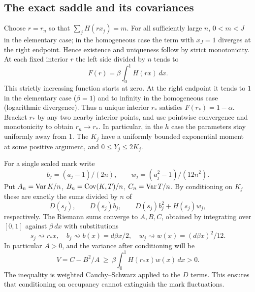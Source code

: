 \documentclass[11pt,a4paper]{article}
\begin{document}
\subsection{The exact saddle and its covariances}
Choose $r=r_n$ so that $\sum_j H(r x_j)=m$. For all sufficiently large $n$, $0<m<J$ in the elementary case; in the homogeneous case the term with $x_J=1$ diverges at the right endpoint. Hence existence and uniqueness follow by strict monotonicity. At each fixed interior $r$ the left side divided by $n$ tends to
\[
 F(r)=\beta\int_0^1 H(rx)\,dx.
\]
This strictly increasing function starts at zero. At the right endpoint it tends to $1$ in the elementary case ($\beta=1$) and to infinity in the homogeneous case (logarithmic divergence). Thus a unique interior $r_*$ satisfies $F(r_*)=1-\alpha$. Bracket $r_*$ by any two nearby interior points, and use pointwise convergence and monotonicity to obtain $r_n\to r_*$. In particular, in the $h$ case the parameters stay uniformly away from 1. The $K_j$ have a uniformly bounded exponential moment at some positive argument, and $0\le Y_j\le 2K_j$.

For a single scaled mark write
\[
 b_j=(a_j-1)/(2n),\qquad w_j=(a_j^2-1)/(12n^2).
\]
Put $A_n=\operatorname{Var} K/n$, $B_n=\operatorname{Cov}(K,T)/n$, $C_n=\operatorname{Var} T/n$. By conditioning on $K_j$ these are exactly the sums divided by $n$ of
\[
 D(s_j),\qquad D(s_j)b_j,\qquad D(s_j)b_j^2+H(s_j)w_j,
\]
respectively. The Riemann sums converge to $A,B,C$, obtained by integrating over $[0,1]$ against $\beta\,dx$ with substitutions
\[
 s_j\rightsquigarrow r_*x,\quad b_j\rightsquigarrow b(x)=d\beta x/2,\quad
 w_j\rightsquigarrow w(x)=(d\beta x)^2/12.
\]
In particular $A>0$, and the variance after conditioning will be
\begin{equation}\label{R20H:V}
 V=C-B^2/A\ \ge\ \beta\int_0^1 H(r_*x)w(x)\,dx>0.
\end{equation}
The inequality is weighted Cauchy--Schwarz applied to the $D$ terms. This ensures that conditioning on occupancy cannot extinguish the mark fluctuations.
\end{document}
